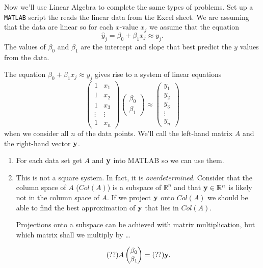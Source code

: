 \begin{problem}
    Now we'll use Linear Algebra to complete the same types of problems.  Set up a
    \texttt{MATLAB} script the reads the linear data from the Excel sheet.  We are
    assuming that the data are linear so for each $x$-value $x_j$ we assume that the equation 
    \[ \hat{y}_j =  \beta_0 + \beta_1 x_j \approx y_j. \]
    The values of $\beta_0$ and $\beta_1$ are the intercept and slope that best predict
    the $y$ values from the data.

    The equation $\beta_0 + \beta_1 x_j \approx y_j$ gives rise to a system of linear equations
    \[ \begin{pmatrix} 1 & x_1 \\ 1 & x_2 \\ 1 & x_3 \\ \vdots & \vdots \\ 1 & x_n
        \end{pmatrix} \begin{pmatrix} \beta_0 \\ \beta_1 \end{pmatrix} \approx \begin{pmatrix} y_1
            \\ y_2 \\ y_3 \\ \vdots \\ y_n \end{pmatrix} \]
    when we consider all $n$ of the data points.
    We'll call the left-hand matrix $A$ and the right-hand vector ${\bf y}$.  
    \begin{enumerate}
        \item For each data set get $A$ and ${\bf y}$ into MATLAB so we can use them.
        \item This is not a square system. In fact, it is {\it overdetermined}.  Consider
            that the column space of $A$ ($Col(A)$) is a subspace of $\mathbb{R}^n$ and
            that ${\bf y} \in \mathbb{R}^n$ is likely not in the column space of $A$.  If we
            project ${\bf y}$ onto $Col(A)$ we should be able to find the best approximation
            of ${\bf y}$ that lies in $Col(A)$. 

            Projections onto a subspace can be achieved with matrix multiplication, but
            which matrix shall we multiply by \dots

            \[ (??) A \begin{pmatrix} \beta_0 \\ \beta_1 \end{pmatrix}  = (??) {\bf y}. \]


\end{enumerate}
\end{problem}
